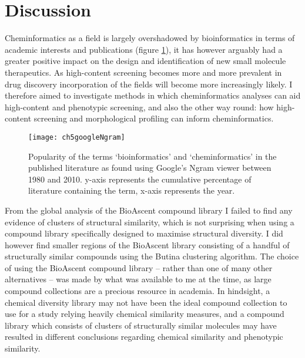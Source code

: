 \documentclass[a4paper,11pt,twoside,openright]{scrbook}
\begin{document}
\section{Discussion}

Cheminformatics as a field is largely overshadowed by bioinformatics in terms of academic interests and publications 
(figure \ref{figure:informatics_ngram}), it has however arguably had a greater positive impact on the design and 
identification of new small molecule therapeutics.
As high-content screening becomes more and more prevalent in drug discovery incorporation of the fields will become 
more increasingly likely.
I therefore aimed to investigate methods in which cheminformatics analyses can aid high-content and phenotypic 
screening, and also the other way round: how high-content screening and morphological profiling can inform 
cheminformatics.


\begin{figure}
    \captionsetup{width=0.8\textwidth}
    \caption[Popularity of terms `bioinformatics' and `cheminformatics' in the literature]{
Popularity of the terms `bioinformatics' and `cheminformatics' in the published literature as found using Google's 
Ngram viewer between 1980 and 2010.
y-axis represents the cumulative percentage of literature containing the term, x-axis represents the year.
}
    \texttt{[image: ch5googleNgram]}
    \label{figure:informatics_ngram}
\end{figure}

From the global analysis of the BioAscent compound library I failed to find any evidence of clusters of structural 
similarity, which is not surprising when using a compound library specifically designed to maximise structural 
diversity.
I did however find smaller regions of the BioAscent library consisting of a handful of structurally similar compounds 
using the Butina clustering algorithm.
The choice of using the BioAscent compound library -- rather than one of many other alternatives -- was made by what 
was available to me at the time, as large compound collections are a precious resource in academia.
In hindsight, a chemical diversity library may not have been the ideal compound collection to use for a study relying 
heavily chemical similarity measures, and a compound library which consists of clusters of structurally similar 
molecules may have resulted in different conclusions regarding chemical similarity and phenotypic similarity.
\end{document}

